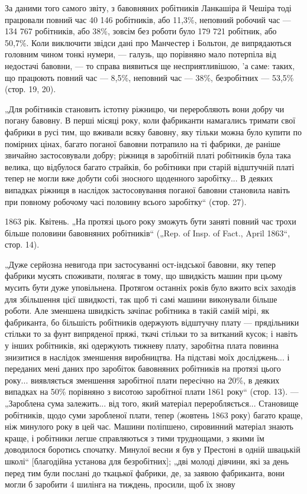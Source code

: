 
За даними того самого звіту, з бавовняних робітників Ланкашіра
й Чешіра тоді працювали повний час 40 146 робітників,
або 11,3\%, неповний робочий час — 134 767 робітників, або 38\%,
зовсім без роботи було 179 721 робітник, або 50,7\%. Коли виключити
звідси дані про Манчестер і Больтон, де випрядаються
головним чином тонкі нумери, — галузь, що порівняно мало потерпіла
від недостачі бавовни, — то справа виявиться ще несприятливішою, 'а
саме: таких, що працюють повний час — 8,5\%,
неповний час — 38\%, безробітних — 53,5\% (стор. 19, 20).

„Для робітників становить істотну ріжницю, чи переробляють
вони добру чи погану бавовну. В перші місяці року, коли фабриканти
намагались тримати свої фабрики в русі тим, що вживали
всяку бавовну, яку тільки можна було купити по помірних цінах,
багато поганої бавовни потрапило на ті фабрики, де раніше звичайно
застосовували добру; ріжниця в заробітній платі робітників
була така велика, що відбулося багато страйків, бо робітники
при старій відштучній платі тепер не могли вже добути
собі зносного щоденного заробітку... В деяких випадках ріжниця
в наслідок застосовування поганої бавовни становила навіть при
повному робочому часі половину всього заробітку“ (стор. 27).

1863 рік. Квітень. „На протязі цього року зможуть бути заняті
повний час трохи більше половини бавовняних робітників“
(„Rep. of Insp. of Fact., April 1863“, стор. 14).

„Дуже серйозна невигода при застосуванні ост-індської бавовни,
яку тепер фабрики мусять споживати, полягає в тому,
що швидкість машин при цьому мусить бути дуже уповільнена.
Протягом останніх років було вжито всіх заходів для збільшення
цієї швидкості, так щоб ті самі машини виконували більше
роботи. Але зменшена швидкість зачіпає робітника в такій самій
мірі, як фабриканта, бо більшість робітників одержують відштучну
плату — прядільники стільки то за фунт випряденої
пряжі, ткачі стільки то за витканий кусок; і навіть у інших
робітників, які одержують тижневу плату, заробітна плата повинна
знизитися в наслідок зменшення виробництва. На підставі
моїх досліджень... і переданих мені даних про заробіток бавовняних
робітників на протязі цього року... виявляється зменшення
заробітної плати пересічно на 20\%, в деяких випадках
на 50\% порівняно з висотою заробітної плати 1861 року“
(стор. 13). — „Зароблена сума залежить... від того, який матеріал
переробляється... Становище робітників, щодо суми заробленої
плати, тепер (жовтень 1863 року) багато краще, ніж минулого
року в цей час. Машини поліпшено, сировинний матеріал
знають краще, і робітники легше справляються з тими труднощами,
з якими їм доводилося боротись спочатку. Минулої весни
я був у Престоні в одній швацькій школі“ [благодійна установа
для безробітних]; „дві молоді дівчини, які за день перед тим
були послані до ткацької фабрики, де, за заявою фабриканта, вони
могли б заробити 4 шилінга на тиждень, просили, щоб їх знову
\parbreak{}  %
